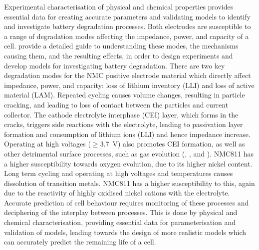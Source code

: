 \documentclass[journal=jacsat,manuscript=article]{achemso}
\begin{document}
Experimental characterisation of physical and chemical properties provides essential data for creating accurate parameters and validating models to identify and investigate battery degradation processes. 
Both electrodes are susceptible to a range of degradation modes affecting the impedance, power, and capacity of a cell. 
\citeauthor{Edge2021Degradation} provide a detailed guide to understanding these modes, the mechanisms causing them, and the resulting effects, in order to design experiments and develop models for investigating battery degradation.\cite{Edge2021Degradation} 
There are two key degradation modes for the NMC positive electrode material which directly affect impedance, power, and capacity: loss of lithium inventory (LLI) and loss of active material (LAM).\cite{erickson2017recent,erickson2017recent}
Repeated cycling causes volume changes, resulting in particle cracking,\cite{Woodford2010} and leading to loss of contact between the particles and current collector.\cite{erickson2017recent} 
The cathode electrolyte interphase (CEI) layer, which forms in the cracks, triggers side reactions with the electrolyte, leading to passivation layer formation and consumption of lithium ions (LLI) and hence impedance increase.\cite{erickson2017recent}
Operating at high voltages ($\geq$\SI{3.7}{V}) also promotes CEI formation, as well as other detrimental surface processes, such as gas evolution (, , and ).\cite{jung2017chemical} 
NMC811 has a higher susceptibility towards oxygen evolution, due to its higher nickel content.\cite{Phillip2020} 
Long term cycling and operating at high voltages and temperatures causes dissolution of transition metals.\cite{li2018temperature} 
NMC811 has a higher susceptibility to this, again due to the reactivity of highly oxidised nickel cations with the electrolyte.\cite{billy2018dissolution} 
Accurate prediction of cell behaviour requires monitoring of these processes and deciphering of the interplay between processes.
This is done by physical and chemical characterisation, providing essential data for parameterisation and validation of models, leading towards the design of more realistic models which can accurately predict the remaining life of a cell.
\end{document}
